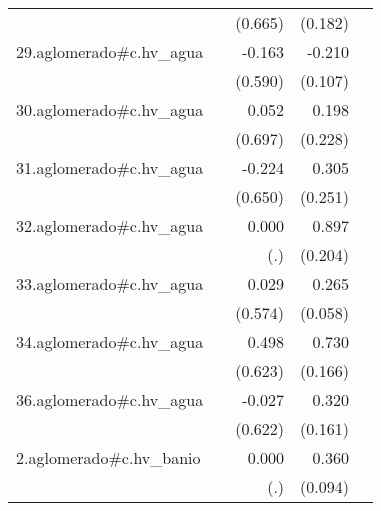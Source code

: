 {\begin{longtable}{l*{4}{D{.}{.}{-1}}}
            &                     &     (0.665)         &     (0.182)         &                     \\
\addlinespace
29.aglomerado#c.hv\_agua&                     &      -0.163         &      -0.210\sym{*}  &                     \\
            &                     &     (0.590)         &     (0.107)         &                     \\
\addlinespace
30.aglomerado#c.hv\_agua&                     &       0.052         &       0.198         &                     \\
            &                     &     (0.697)         &     (0.228)         &                     \\
\addlinespace
31.aglomerado#c.hv\_agua&                     &      -0.224         &       0.305         &                     \\
            &                     &     (0.650)         &     (0.251)         &                     \\
\addlinespace
32.aglomerado#c.hv\_agua&                     &       0.000         &       0.897\sym{***}&                     \\
            &                     &         (.)         &     (0.204)         &                     \\
\addlinespace
33.aglomerado#c.hv\_agua&                     &       0.029         &       0.265\sym{***}&                     \\
            &                     &     (0.574)         &     (0.058)         &                     \\
\addlinespace
34.aglomerado#c.hv\_agua&                     &       0.498         &       0.730\sym{***}&                     \\
            &                     &     (0.623)         &     (0.166)         &                     \\
\addlinespace
36.aglomerado#c.hv\_agua&                     &      -0.027         &       0.320\sym{*}  &                     \\
            &                     &     (0.622)         &     (0.161)         &                     \\
\addlinespace
2.aglomerado#c.hv\_banio&                     &       0.000         &       0.360\sym{***}&                     \\
            &                     &         (.)         &     (0.094)         &                     \\

\end{longtable}}
